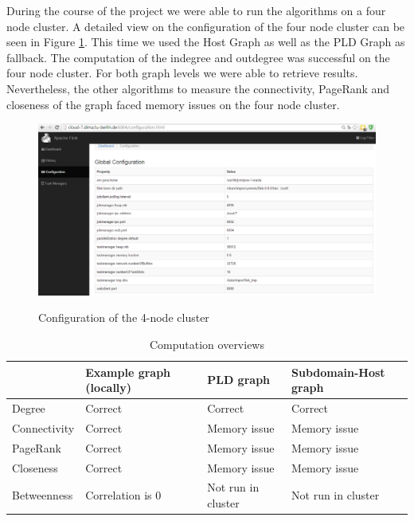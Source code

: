 During the course of the project we were able to run the algorithms on a four node cluster. A detailed view on the configuration of the four node cluster can be seen in Figure \ref{fig6a}. This time we used the Host Graph as well as the PLD Graph as fallback. The computation of the indegree and outdegree was successful on the four node cluster. For both graph levels we were able to retrieve results. Nevertheless, the other algorithms to measure the connectivity, PageRank and closeness of the graph faced memory issues on the four node cluster.

\begin{figure}[h]
	\begin{center}
		\label{fig6a}		
		\includegraphics[width=1.0\textwidth]{fig6a}	
		\caption{Configuration of the 4-node cluster}	
	\end{center}
\end{figure}

\begin{table}[t]
	\caption{Computation overviews}
	\label{t3}
	\begin{center}
		\begin{tabular}{|l|l|l|l|}
			\hline		
				&Example graph (locally)	&PLD graph	&Subdomain-Host graph \\ \hline
			Degree	&Correct	&Correct	&Correct \\ \hline
			Connectivity	&Correct	&Memory issue	&Memory issue	\\ \hline
			PageRank	&Correct	&Memory issue	&Memory issue	\\ \hline
			Closeness	&Correct	&Memory issue	&Memory issue	\\ \hline
			Betweenness	&Correlation is 0	&Not run in cluster	&Not run in cluster	\\ \hline
		\end{tabular}
	\end{center}
\end{table}


